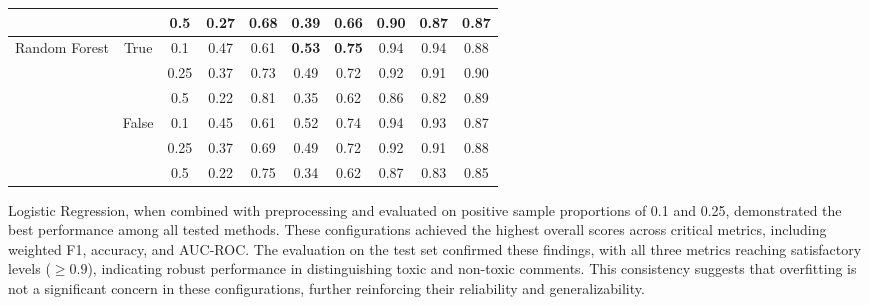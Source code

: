 \begin{table}[h!]
{\begin{tabular}{lccccccccc}
                           &                        & 0.5           & 0.27                 & 0.68              & 0.39           & 0.66            & 0.90               & 0.87           & 0.87               \\ \hline
Random Forest              & True                   & 0.1           & 0.47               & 0.61            & \textbf{0.53}         & \textbf{0.75}          & 0.94             & 0.94         & 0.88             \\ 
                           &                        & 0.25          & 0.37                 & 0.73              & 0.49           & 0.72            & 0.92               & 0.91           & 0.90               \\ 
                           &                        & 0.5           & 0.22                 & 0.81              & 0.35           & 0.62            & 0.86               & 0.82           & 0.89               \\ 
                           & False                  & 0.1           & 0.45                 & 0.61              & 0.52           & 0.74            & 0.94               & 0.93           & 0.87               \\ 
                           &                        & 0.25          & 0.37                 & 0.69              & 0.49           & 0.72            & 0.92               & 0.91           & 0.88               \\ 
                           &                        & 0.5           & 0.22                 & 0.75              & 0.34           & 0.62            & 0.87               & 0.83           & 0.85               \\ \hline
\end{tabular}%
}
\end{table}

Logistic Regression, when combined with preprocessing and evaluated on positive sample proportions of 0.1 and 0.25, demonstrated the best performance among all tested methods. These configurations achieved the highest overall scores across critical metrics, including weighted F1, accuracy, and AUC-ROC. The evaluation on the test set confirmed these findings, with all three metrics reaching satisfactory levels ($\geq 0.9$), indicating robust performance in distinguishing toxic and non-toxic comments. This consistency suggests that overfitting is not a significant concern in these configurations, further reinforcing their reliability and generalizability.

